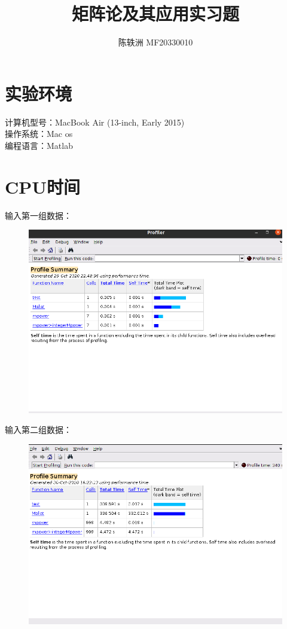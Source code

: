 \documentclass{article}
\title{矩阵论及其应用实习题}
\author{陈轶洲 MF20330010}
\begin{document}
	\maketitle
	
\section{实验环境}

计算机型号：MacBook Air (13-inch, Early 2015)\\
操作系统：Mac os\\
编程语言：Matlab
	
	
\section{CPU时间}
输入第一组数据：
\begin{figure}[h]
	\centering
	\includegraphics[scale=0.6]{test1.png}
\end{figure}

输入第二组数据：
\begin{figure}[h]
	\centering
	\includegraphics[scale=0.6]{test2.png}
\end{figure}
\end{document}
